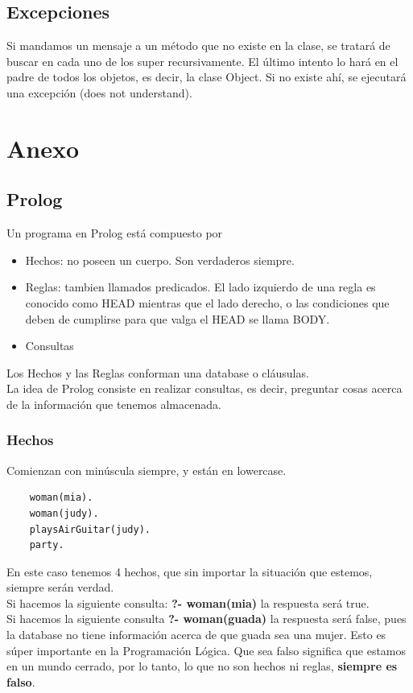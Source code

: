 \documentclass[10pt,a4paper]{article}
\begin{document}
\subsection*{Excepciones}
Si mandamos un mensaje a un método que no existe en la clase, se tratará de buscar en cada uno de los super recursivamente. El último intento lo hará en el padre de todos los objetos, es decir, la clase Object. Si no existe ahí, se ejecutará una excepción (does not understand).


\section*{Anexo}
\subsection*{Prolog}
Un programa en Prolog está compuesto por
\begin{itemize}
    \item Hechos: no poseen un cuerpo. Son verdaderos siempre.
    \item Reglas: tambien llamados predicados. El lado izquierdo de una regla es conocido como HEAD mientras que el lado derecho, o las condiciones que deben de cumplirse para que valga el HEAD se llama BODY.
    \item Consultas
\end{itemize}
Los Hechos y las Reglas conforman una database o cláusulas. \\
La idea de Prolog consiste en realizar consultas, es decir, preguntar cosas acerca de la información que tenemos almacenada. \\
\subsubsection*{Hechos}
Comienzan con minúscula siempre, y están en lowercase.
\begin{lstlisting}
    woman(mia).
    woman(judy).
    playsAirGuitar(judy).
    party. 
\end{lstlisting}
En este caso tenemos 4 hechos, que sin importar la situación que estemos, siempre serán verdad. \\
Si hacemos la siguiente consulta: \textbf{?- woman(mia)} la respuesta será true. \\
Si hacemos la siguiente consulta \textbf{?- woman(guada)} la respuesta será false, pues la database no tiene información acerca de que guada sea una mujer. Esto es súper importante en la Programación Lógica. Que sea falso significa que estamos en un mundo cerrado, por lo tanto, lo que no son hechos ni reglas, \textbf{siempre es falso}.
\end{document}
